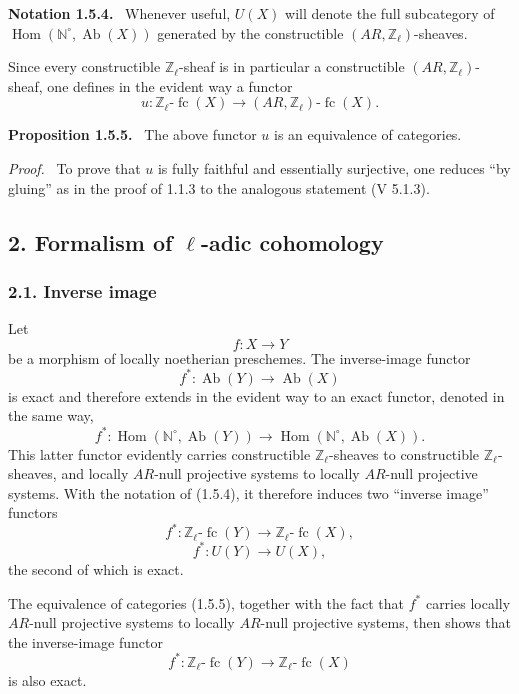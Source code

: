 \documentclass[11pt]{article}
\newenvironment{statement}[1]{\par\medskip\noindent\textbf{#1.}\ }{\par\medskip}
\newenvironment{prooftext}[1][Proof]{\par\noindent\emph{#1.}\ }{\par\medskip}
\DeclareMathOperator{\Hom}{Hom}
\providecommand{\Hom}{\operatorname{Hom}}
\providecommand{\Ab}{\operatorname{Ab}}
\providecommand{\fc}{\operatorname{fc}}
\providecommand{\Ab}{\operatorname{Ab}}
\begin{document}
\begin{statement}{Notation 1.5.4}
Whenever useful, \(U(X)\) will denote the full subcategory of \(\Hom(\mathbb N^\circ,\Ab(X))\) generated by the constructible \((AR,\mathbb Z_\ell)\)-sheaves.
\end{statement}

Since every constructible \(\mathbb Z_\ell\)-sheaf is in particular a constructible \((AR,\mathbb Z_\ell)\)-sheaf, one defines in the evident way a functor
\[
u:\mathbb Z_\ell\text{-}\fc(X)\longrightarrow (AR,\mathbb Z_\ell)\text{-}\fc(X).
\]

\begin{statement}{Proposition 1.5.5}
The above functor \(u\) is an equivalence of categories.
\end{statement}

\begin{prooftext}[Proof]
To prove that \(u\) is fully faithful and essentially surjective, one reduces ``by gluing'' as in the proof of 1.1.3 to the analogous statement (V 5.1.3).
\end{prooftext}

\subsection*{2. Formalism of \(\ell\)-adic cohomology}

\subsubsection*{2.1. Inverse image}

Let
\[
f:X\longrightarrow Y
\]
be a morphism of locally noetherian preschemes. The inverse-image functor
\[
f^*:\Ab(Y)\longrightarrow \Ab(X)
\]
is exact and therefore extends in the evident way to an exact functor, denoted in the same way,
\[
f^*:\Hom(\mathbb N^\circ,\Ab(Y))\longrightarrow \Hom(\mathbb N^\circ,\Ab(X)).
\]
This latter functor evidently carries constructible \(\mathbb Z_\ell\)-sheaves to constructible \(\mathbb Z_\ell\)-sheaves, and locally \(AR\)-null projective systems to locally \(AR\)-null projective systems. With the notation of (1.5.4), it therefore induces two ``inverse image'' functors
\[
f^*:\mathbb Z_\ell\text{-}\fc(Y)\longrightarrow \mathbb Z_\ell\text{-}\fc(X),
\]
\[
f^*:U(Y)\longrightarrow U(X),
\]
the second of which is exact.

The equivalence of categories (1.5.5), together with the fact that \(f^*\) carries locally \(AR\)-null projective systems to locally \(AR\)-null projective systems, then shows that the inverse-image functor
\[
f^*:\mathbb Z_\ell\text{-}\fc(Y)\longrightarrow \mathbb Z_\ell\text{-}\fc(X)
\]
is also exact.
\end{document}
